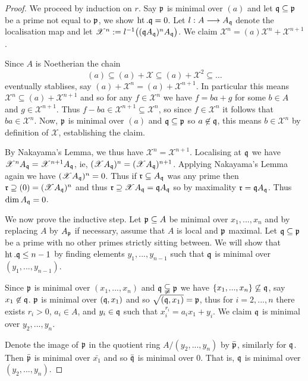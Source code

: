 \documentclass[12pt]{article}
\theoremstyle{plain}
\theoremstyle{definition}
\newcommand{\scr}[1]{\mathscr{#1}}
\newcommand{\lto}{\longrightarrow}
\begin{document}
\begin{proof}
We proceed by induction on $r$. Say $\frak{p}$ is minimal over $(a)$ and let $\frak{q} \subseteq \frak{p}$ be a prime not equal to $\frak{p}$, we show $\operatorname{ht}.\frak{q} = 0$. Let $l: A \lto A_\frak{q}$ denote the localisation map and let $\scr{X}^n:= l^{-1}\big((\frak{q}A_\frak{q})^nA_\frak{q}\big)$. We claim $\scr{X}^n = (a)\scr{X}^n + \scr{X}^{n+1}$.

Since $A$ is Noetherian the chain
\[(a) \subseteq (a) + \scr{X} \subseteq (a) + \scr{X}^2 \subseteq \hdots\]
eventually stablises, say $(a) + \scr{X}^n = (a) + \scr{X}^{n+1}$. In particular this means $\scr{X}^n \subseteq (a) + \scr{X}^{n+1}$ and so for any $f \in \scr{X}^n$ we have $f = ba + g$ for some $b \in A$ and $g \in \scr{X}^{n+1}$. Thus $f - ba \in \scr{X}^{n+1} \subseteq \scr{X}^n$, so since $f \in \scr{X}^n$ it follows that $ba \in \scr{X}^n$. Now, $\frak{p}$ is minimal over $(a)$ and $\frak{q} \subseteq \frak{p}$ so $a \not\in \frak{q}$, this means $b \in \scr{X}^n$ by definition of $\scr{X}$, establishing the claim.

By Nakayama's Lemma, we thus have $\scr{X}^n = \scr{X}^{n+1}$. Localising at $\frak{q}$ we have $\scr{X}^nA_\frak{q} = \scr{X}^{n+1}A_\frak{q}$, ie, $(\scr{X}A_\frak{q})^n = (\scr{X}A_\frak{q})^{n+1}$. Applying Nakayama's Lemma again we have $(\scr{X} A_\frak{q})^n = 0$. Thus if $\frak{r} \subseteq A_\frak{q}$ was any prime then $\frak{r} \supseteq (0) = (\scr{X}A_\frak{q})^n$ and thus $\frak{r} \supseteq \scr{X}A_\frak{q} = \frak{q}A_\frak{q}$ so by maximality $\frak{r} = \frak{q}A_\frak{q}$. Thus $\operatorname{dim}A_\frak{q} = 0$.

We now prove the inductive step. Let $\frak{p} \subseteq A$ be minimal over $x_1,...,x_n$ and by replacing $A$ by $A_\frak{p}$ if necessary, assume that $A$ is local and $\frak{p}$ maximal. Let $\frak{q} \subseteq \frak{p}$ be a prime with no other primes strictly sitting between. We will show that $\operatorname{ht}.\frak{q} \leq n-1$ by finding elements $y_1,...,y_{n-1}$ such that $\frak{q}$ is minimal over $(y_1,...,y_{n-1})$.

Since $\frak{p}$ is minimal over $(x_1,...,x_n)$ and $\frak{q} \subsetneqq \frak{p}$ we have $\lbrace x_1,...,x_n \rbrace \not\subseteq \frak{q}$, say $x_1 \not\in \frak{q}$. $\frak{p}$ is minimal over $(\frak{q},x_1)$ and so $\sqrt{(\frak{q},x_1)} = \frak{p}$, thus for $i = 2,...,n$ there exists $r_i > 0$, $a_i \in A$, and $y_i \in \frak{q}$ such that $x_i^{r_i} = a_ix_1 + y_i$. We claim $\frak{q}$ is minimal over $y_2,...,y_{n}$.

Denote the image of $\frak{p}$ in the quotient ring $A/(y_2,...,y_n)$ by $\bar{\frak{p}}$, similarly for $\frak{q}$. Then $\bar{\frak{p}}$ is minimal over $\bar{x_1}$ and so $\bar{\frak{q}}$ is minimal over $0$. That is, $\frak{q}$ is minimal over $(y_2,...,y_n)$.
\end{proof}
\end{document}
